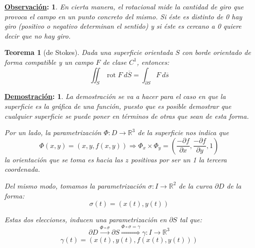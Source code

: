 \documentclass[10pt,a4paper,openright]{book}
\theoremstyle{break}
\newtheorem*{theo}{Teorema}
\newtheorem*{demo}{\underline{Demostración}:}
\newtheorem*{obs}{\underline{Observación}:}
\DeclareMathOperator{\rot}{rot}
\newcommand{\dif}[1]{\ d#1}
\begin{document}
\begin{obs}
En cierta manera, el rotacional mide la cantidad de giro que provoca el campo en un punto concreto del mismo. Si éste es distinto de 0 hay giro (positivo o negativo determinan el sentido) y si éste es cercano a 0 quiere decir que no hay giro.
\end{obs}

\begin{theo}[de Stokes]
Dada una superficie orientada $S$ con borde orientado de forma compatible y un campo $F$ de clase $C^1$, entonces:
$$\iint_{S} \rot F \dif{\overline{S}} = \int_{\partial S} F \dif{\overline{s}}$$
\end{theo}
\begin{demo}
La demostración se va a hacer para el caso en que la superficie es la gráfica de una función, puesto que es posible demostrar que cualquier superficie se puede poner en términos de otras que sean de esta forma.

Por un lado, la parametrización $\Phi: D \rightarrow \mathbb{R}^3$ de la superficie nos indica que
$$\Phi\left( x, y \right) = \left( x, y, f\left( x, y \right) \right)\Rightarrow \Phi_x \times \Phi_y = \left( \frac{-\partial f}{\partial x}, \frac{-\partial f}{\partial y}, 1\right)$$
la orientación que se toma es hacia las $z$ positivas por ser un 1 la tercera coordenada.

Del mismo modo, tomamos la parametrización $\sigma: I \rightarrow \mathbb{R}^2$ de la curva $\partial D$ de la forma:
$$\sigma\left( t \right) = \left( x\left( t \right), y\left( t \right) \right)$$

Estas dos elecciones, inducen una parametrización en $\partial S$ tal que: 
$$\partial D \xrightarrow{\Phi \circ \sigma} \partial S \stackrel{\Phi \circ \sigma = \gamma}{\Rightarrow} \gamma: I \rightarrow \mathbb{R}^3$$
$$\gamma\left( t \right) = \left( x\left( t \right), y\left( t \right), f\left( x\left( t \right), y\left( t \right) \right) \right)$$


\end{demo}
\end{document}
